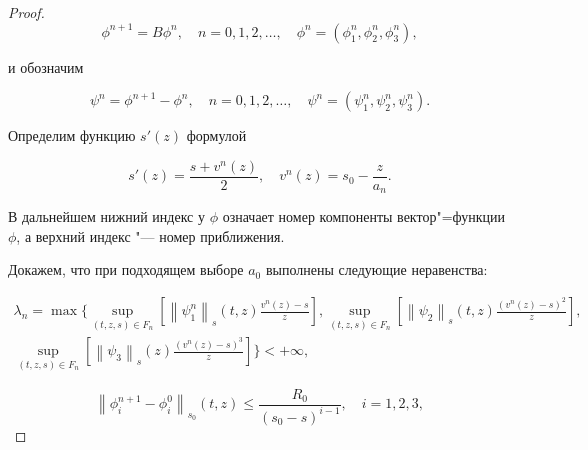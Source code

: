 \begin{proof}
$${\phi ^{n + 1}} = B{\phi ^n},\quad  n = 0, 1, 2, \ldots ,\quad  {\phi ^n} = (\phi _1^n, \phi _2^n,\phi _3^n),$$

и обозначим

$${\psi ^n} = {\phi ^{n + 1}} - {\phi ^n},\quad  n = 0, 1, 2, \ldots ,\quad  {\psi ^n} = \left( {\psi _1^n,\psi _2^n,\psi _3^n} \right).$$







Определим функцию $s'(z)$  формулой

\begin{equation}

s'(z) = \frac{{s + {v^n}(z)}}{2},\quad  {v^n}(z) = {s_0} - \frac{z}{{{a_n}}}. 

\label{dur:15}

\end{equation}

В дальнейшем нижний  индекс у $\phi $  означает номер компоненты вектор"=функции $\phi $, а верхний индекс "--- номер приближения.

 Докажем, что при подходящем выборе $a_0$ выполнены следующие неравенства:

\begin{multline}

\lambda _n = \max \biggl\{\mathop {\sup }\limits_{(t,z,s) \in {F_n}} \left[ {{{\left\| {\psi _1^n} \right\|}_s}(t,z)\frac{{{v^n}(z) - s}}{z}}

 \right],\mathop {\sup }\limits_{(t,z,s) \in {F_n}} \left[ {{{\left\| {{\psi _2}} \right\|}_s}(t,z)\frac{{{{\left( {{v^n}(z) - s} \right)}^2}}}{z}}

 \right],

 \\

 \mathop {\sup }\limits_{(t,z,s) \in {F_n}} \left[ {{{\left\| {{\psi _3}} \right\|}_s}(z)\frac{{{{\left( {{v^n}(z) - s} \right)}^3}}}{z}}

 \right]\biggr\} <  + \infty , 

 \label{dur:16}

\end{multline}

\begin{equation}

{\left\| {\phi _i^{n + 1} - \phi _i^0} \right\|_{{s_0}}}(t,z) \leqslant \frac{{{R_0}}}{{{{({s_0} - s)}^{i - 1}}}} ,\quad  i = 1, 2, 3,

\label{dur:17}

\end{equation}


\end{proof}
